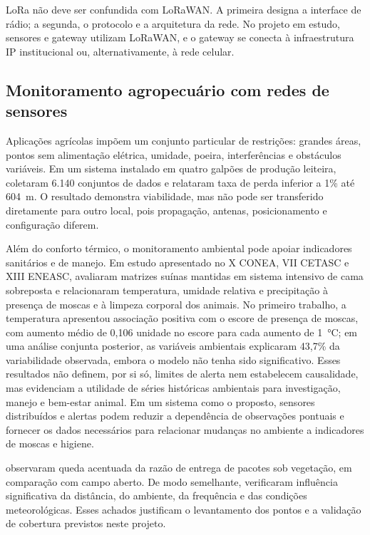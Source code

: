 \documentclass[10pt,a4paper,twocolumn]{article}
\begin{document}
LoRa não deve ser confundida com LoRaWAN. A primeira designa a interface de
rádio; a segunda, o protocolo e a arquitetura da rede. No projeto em estudo,
sensores e gateway utilizam LoRaWAN, e o gateway se conecta à infraestrutura IP
institucional ou, alternativamente, à rede celular.

\subsection{Monitoramento agropecuário com redes de sensores}

Aplicações agrícolas impõem um conjunto particular de restrições: grandes áreas,
pontos sem alimentação elétrica, umidade, poeira, interferências e obstáculos
variáveis. Em um sistema instalado em quatro galpões de produção leiteira,
 coletaram 6.140 conjuntos de dados e relataram taxa de perda
inferior a 1\% até \SI{604}{\meter}. O resultado demonstra viabilidade, mas não
pode ser transferido diretamente para outro local, pois propagação, antenas,
posicionamento e configuração diferem.

Além do conforto térmico, o monitoramento ambiental pode apoiar indicadores
sanitários e de manejo. Em estudo apresentado no X CONEA, VII CETASC e XIII
ENEASC,  avaliaram matrizes suínas mantidas
em sistema intensivo de cama sobreposta e relacionaram temperatura, umidade
relativa e precipitação à presença de moscas e à limpeza corporal dos animais.
No primeiro trabalho, a temperatura apresentou associação positiva com o escore
de presença de moscas, com aumento médio de 0,106 unidade no escore para cada
aumento de \SI{1}{\celsius}; em uma análise conjunta posterior, as variáveis
ambientais explicaram 43,7\% da variabilidade observada, embora o modelo não
tenha sido significativo. Esses resultados não definem, por si só, limites de
alerta nem estabelecem causalidade, mas evidenciam a utilidade de séries
históricas ambientais para investigação, manejo e bem-estar animal. Em um
sistema como o proposto, sensores distribuídos e alertas podem reduzir a
dependência de observações pontuais e fornecer os dados necessários para
relacionar mudanças no ambiente a indicadores de moscas e higiene.

 observaram queda acentuada da razão de entrega de pacotes
sob vegetação, em comparação com campo aberto. De modo semelhante,
 verificaram influência significativa da distância, do
ambiente, da frequência e das condições meteorológicas. Esses achados justificam
o levantamento dos pontos e a validação de cobertura previstos neste projeto.
\end{document}

